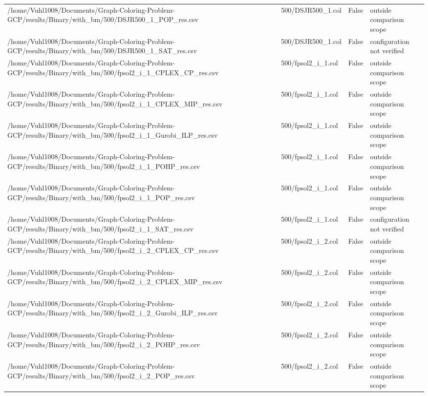 \begin{table}[htbp]
\begin{tabular}{llll}
/home/Vuhl1008/Documents/Graph-Coloring-Problem-GCP/results/Binary/with\_bm/500/DSJR500\_1\_POP\_res.csv & 500/DSJR500\_1.col & False & outside comparison scope \\
/home/Vuhl1008/Documents/Graph-Coloring-Problem-GCP/results/Binary/with\_bm/500/DSJR500\_1\_SAT\_res.csv & 500/DSJR500\_1.col & False & configuration not verified \\
/home/Vuhl1008/Documents/Graph-Coloring-Problem-GCP/results/Binary/with\_bm/500/fpsol2\_i\_1\_CPLEX\_CP\_res.csv & 500/fpsol2\_i\_1.col & False & outside comparison scope \\
/home/Vuhl1008/Documents/Graph-Coloring-Problem-GCP/results/Binary/with\_bm/500/fpsol2\_i\_1\_CPLEX\_MIP\_res.csv & 500/fpsol2\_i\_1.col & False & outside comparison scope \\
/home/Vuhl1008/Documents/Graph-Coloring-Problem-GCP/results/Binary/with\_bm/500/fpsol2\_i\_1\_Gurobi\_ILP\_res.csv & 500/fpsol2\_i\_1.col & False & outside comparison scope \\
/home/Vuhl1008/Documents/Graph-Coloring-Problem-GCP/results/Binary/with\_bm/500/fpsol2\_i\_1\_POHP\_res.csv & 500/fpsol2\_i\_1.col & False & outside comparison scope \\
/home/Vuhl1008/Documents/Graph-Coloring-Problem-GCP/results/Binary/with\_bm/500/fpsol2\_i\_1\_POP\_res.csv & 500/fpsol2\_i\_1.col & False & outside comparison scope \\
/home/Vuhl1008/Documents/Graph-Coloring-Problem-GCP/results/Binary/with\_bm/500/fpsol2\_i\_1\_SAT\_res.csv & 500/fpsol2\_i\_1.col & False & configuration not verified \\
/home/Vuhl1008/Documents/Graph-Coloring-Problem-GCP/results/Binary/with\_bm/500/fpsol2\_i\_2\_CPLEX\_CP\_res.csv & 500/fpsol2\_i\_2.col & False & outside comparison scope \\
/home/Vuhl1008/Documents/Graph-Coloring-Problem-GCP/results/Binary/with\_bm/500/fpsol2\_i\_2\_CPLEX\_MIP\_res.csv & 500/fpsol2\_i\_2.col & False & outside comparison scope \\
/home/Vuhl1008/Documents/Graph-Coloring-Problem-GCP/results/Binary/with\_bm/500/fpsol2\_i\_2\_Gurobi\_ILP\_res.csv & 500/fpsol2\_i\_2.col & False & outside comparison scope \\
/home/Vuhl1008/Documents/Graph-Coloring-Problem-GCP/results/Binary/with\_bm/500/fpsol2\_i\_2\_POHP\_res.csv & 500/fpsol2\_i\_2.col & False & outside comparison scope \\
/home/Vuhl1008/Documents/Graph-Coloring-Problem-GCP/results/Binary/with\_bm/500/fpsol2\_i\_2\_POP\_res.csv & 500/fpsol2\_i\_2.col & False & outside comparison scope \\

\end{tabular}
\end{table}
